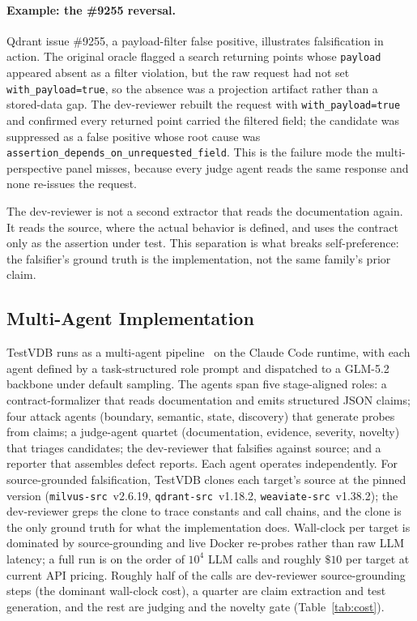 \documentclass[sigconf]{acmart}
\begin{document}
\paragraph{Example: the \#9255 reversal.}
Qdrant issue \#9255, a payload-filter false positive, illustrates falsification in action. The original oracle flagged a search returning points whose \texttt{payload} appeared absent as a filter violation, but the raw request had not set \texttt{with\_payload=true}, so the absence was a projection artifact rather than a stored-data gap. The dev-reviewer rebuilt the request with \texttt{with\_payload=true} and confirmed every returned point carried the filtered field; the candidate was suppressed as a false positive whose root cause was \texttt{assertion\_depends\_on\_unrequested\_field}. This is the failure mode the multi-perspective panel misses, because every judge agent reads the same response and none re-issues the request.

The dev-reviewer is not a second extractor that reads the documentation again. It reads the source, where the actual behavior is defined, and uses the contract only as the assertion under test. This separation is what breaks self-preference: the falsifier's ground truth is the implementation, not the same family's prior claim.

\subsection{Multi-Agent Implementation}
\label{subsec:multiagent}

TestVDB runs as a multi-agent pipeline~\cite{hou23llmse} on the Claude Code runtime, with each agent defined by a task-structured role prompt and dispatched to a GLM-5.2 backbone under default sampling. The agents span five stage-aligned roles: a contract-formalizer that reads documentation and emits structured JSON claims; four attack agents (boundary, semantic, state, discovery) that generate probes from claims; a judge-agent quartet (documentation, evidence, severity, novelty) that triages candidates; the dev-reviewer that falsifies against source; and a reporter that assembles defect reports. Each agent operates independently. For source-grounded falsification, TestVDB clones each target's source at the pinned version (\texttt{milvus-src}~v2.6.19, \texttt{qdrant-src}~v1.18.2, \texttt{weaviate-src}~v1.38.2); the dev-reviewer greps the clone to trace constants and call chains, and the clone is the only ground truth for what the implementation does. Wall-clock per target is dominated by source-grounding and live Docker re-probes rather than raw LLM latency; a full run is on the order of $10^4$ LLM calls and roughly $\$10$ per target at current API pricing. Roughly half of the calls are dev-reviewer source-grounding steps (the dominant wall-clock cost), a quarter are claim extraction and test generation, and the rest are judging and the novelty gate (Table~\ref{tab:cost}).
\end{document}
